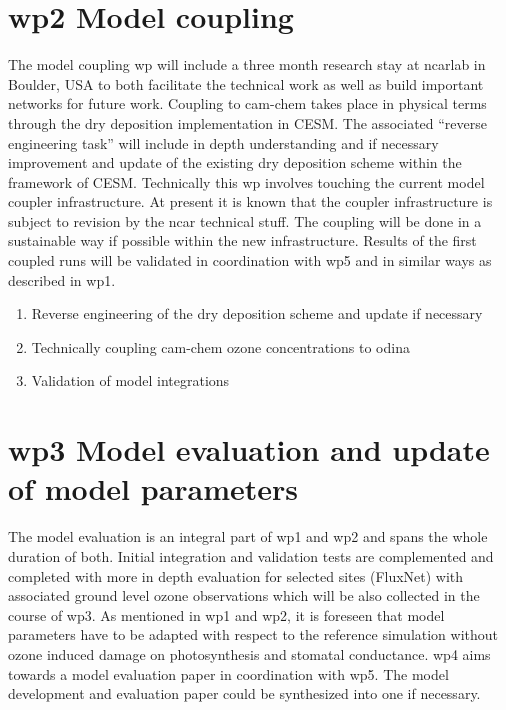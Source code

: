 \section*{\gls{wp}2 Model coupling}
\label{ssec:wp2}
The model coupling \gls{wp} will include a three month research stay at \gls{ncar}lab in Boulder, USA to both facilitate the technical work as well as build important networks for future work. Coupling to \gls{cam}-chem takes place in physical terms through the dry deposition implementation in CESM. The associated “reverse engineering task” will include in depth understanding and if necessary improvement and update of the existing dry deposition scheme within the framework of CESM. Technically this \gls{wp} involves touching the current model coupler infrastructure. At present it is known that the coupler infrastructure is subject to revision by the \gls{ncar} technical stuff. The coupling will be done in a sustainable way if possible within the new infrastructure. Results of the first coupled runs will be validated in coordination with \gls{wp}5 and in similar ways as described in \gls{wp}1.

\begin{enumerate}[start=1,label={T2.\arabic*:}]
  \itemsep0pt
\item Reverse engineering of the dry deposition scheme and update if necessary 
\item Technically coupling \gls{cam}-chem ozone concentrations to \gls{odina}
\item Validation of model integrations
\end{enumerate}

\section*{\gls{wp}3 Model evaluation and update of model parameters}
\label{ssec:wp3}
The model evaluation is an integral part of \gls{wp}1 and \gls{wp}2 and spans the whole duration of both. Initial integration and validation tests are complemented and completed with more in depth evaluation for selected sites (FluxNet) with associated ground level ozone observations which will be also collected in the course of \gls{wp}3. As mentioned in \gls{wp}1 and \gls{wp}2, it is foreseen that model parameters have to be adapted with respect to the reference simulation without ozone induced damage on photosynthesis and stomatal conductance. \gls{wp}4 aims towards a model evaluation paper in coordination with \gls{wp}5. The model development and evaluation paper could be synthesized into one if necessary.

